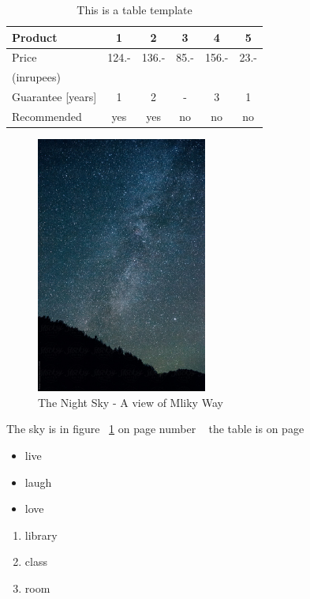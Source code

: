 \documentclass[a4paper,12pt]{article}
\begin{document}
\begin{table}[t]
\centering
\begin{tabular}{|l|c|c|c|c|c|}
\hline
Product & 1 & 2 & 3 & 4 & 5\\
\hline
Price & 124.- & 136.- & 85.- & 156.- & 23.-\\
(inrupees)& & & & & \\
\hline
Guarantee [years] & 1 & 2 & - & 3 & 1\\
\hline
Recommended & yes & yes & no & no & no\\
\hline
\end{tabular}
\caption{This is a table template}
\label{tab:table}
\end{table}
\newpage
\newpage
\begin{figure}[ht]
\centering
\includegraphics[width=0.5\textwidth]{index.jpg}
\caption{The Night Sky -  A view of Mliky Way}
\label{fig:sky}
\end{figure} 
\centering
\newpage   
The sky is in figure ~\ref{fig:sky} on page number ~\pageref{fig:sky}
the table is on page ~\pageref{tab:table}
\begin{itemize}
\item live
\item laugh
\item love
\end{itemize}
\begin{enumerate}
\item library
\item class
\item room
\end{enumerate}
\end{document}
